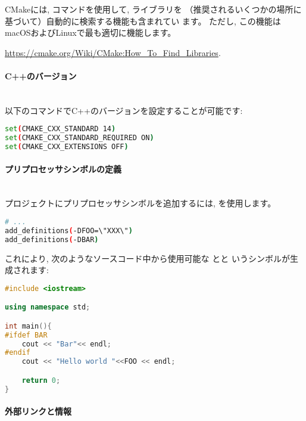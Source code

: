 \documentclass[uplatex,11pt,a4paper,landscape,dvipdfmx]{jsarticle} %
\newcommand{\sectiontitle}[1]{\paragraph{#1} \ \\} %
\begin{document}
\begin{multicols}{2}
CMakeには, コマンドを使用して, ライブラリを
（推奨されるいくつかの場所に基づいて）自動的に検索する機能も含まれてい
ます。 ただし, この機能はmacOSおよびLinuxで最も適切に機能します。

\url{https://cmake.org/Wiki/CMake:How_To_Find_Libraries}.

\sectiontitle{C++のバージョン}

以下のコマンドでC++のバージョンを設定することが可能です:

\begin{lstlisting}[language=bash]
set(CMAKE_CXX_STANDARD 14)
set(CMAKE_CXX_STANDARD_REQUIRED ON)
set(CMAKE_CXX_EXTENSIONS OFF)
\end{lstlisting}

\sectiontitle{プリプロセッサシンボルの定義}

プロジェクトにプリプロセッサシンボルを追加するには,
 を使用します。

\begin{lstlisting}[language=bash]
# ...
add_definitions(-DFOO=\"XXX\")
add_definitions(-DBAR)
\end{lstlisting}

これにより, 次のようなソースコード中から使用可能な とと
いうシンボルが生成されます:

\begin{lstlisting}[language=c++]
#include <iostream>

using namespace std;

int main(){
#ifdef BAR
    cout << "Bar"<< endl;
#endif
    cout << "Hello world "<<FOO << endl;

    return 0;
}
\end{lstlisting}

\vspace{\baselineskip} %


\sectiontitle{外部リンクと情報}


\end{multicols}
\end{document}
